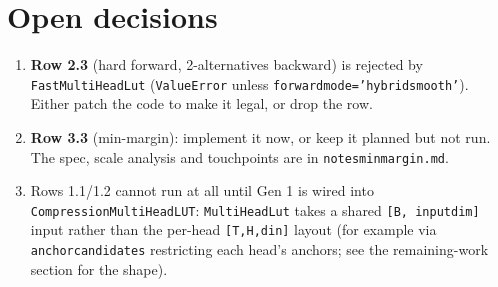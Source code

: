 \documentclass[10pt]{article}
\newcommand{\code}[1]{{\renewcommand{\_}{\textunderscore\allowbreak}\texttt{#1}}}
\begin{document}
\section*{Open decisions}
\begin{enumerate}\setlength\itemsep{1pt}
\item \textbf{Row 2.3} (hard forward, 2-alternatives backward) is rejected by \code{FastMultiHeadLut} (\code{ValueError} unless \code{forward\_mode='hybrid\_smooth'}).
  Either patch the code to make it legal, or drop the row.
\item \textbf{Row 3.3} (min-margin): implement it now, or keep it planned but not run. The spec, scale analysis and touchpoints are in \code{notes\_min\_margin.md}.
\item Rows 1.1/1.2 cannot run at all until Gen 1 is wired into \code{CompressionMultiHeadLUT}: \code{MultiHeadLut} takes a shared \code{[B, input\_dim]} input rather than
  the per-head \code{[T,H,d\_in]} layout (for example via \code{anchor\_candidates} restricting each head's anchors; see the remaining-work section for the shape).
\end{enumerate}
\end{document}
